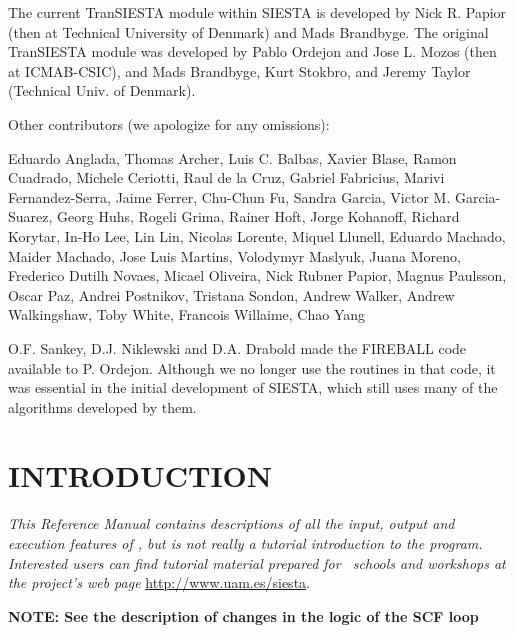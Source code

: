 The current TranSIESTA module within SIESTA is developed by 
Nick R. Papior (then at Technical University of Denmark) and Mads Brandbyge. 
The original TranSIESTA module was developed by
Pablo Ordejon and Jose L. Mozos (then at ICMAB-CSIC), and Mads Brandbyge,
Kurt Stokbro, and Jeremy Taylor (Technical Univ. of Denmark).

Other contributors (we apologize for any omissions):

Eduardo Anglada,
Thomas Archer,
Luis C. Balbas,
Xavier Blase,
Ramon Cuadrado,
Michele Ceriotti,
Raul de la Cruz,
Gabriel Fabricius,
Marivi Fernandez-Serra,
Jaime Ferrer,
Chu-Chun Fu,
Sandra Garcia,
Victor M. Garcia-Suarez,
Georg Huhs,
Rogeli Grima,
Rainer Hoft,
Jorge Kohanoff,
Richard Korytar,
In-Ho Lee,
Lin Lin,
Nicolas Lorente,
Miquel Llunell,
Eduardo Machado,
Maider Machado,
Jose Luis Martins,
Volodymyr Maslyuk,
Juana Moreno,
Frederico Dutilh Novaes, 
Micael Oliveira,
Nick Rubner Papior,
Magnus Paulsson,
Oscar Paz,
Andrei Postnikov,
Tristana Sondon,
Andrew Walker,
Andrew Walkingshaw,
Toby White,
Francois Willaime,
Chao Yang

O.F. Sankey, D.J. Niklewski and D.A. Drabold made the FIREBALL code
available to P. Ordejon.  Although we no longer use the routines in
that code, it was essential in the initial development of SIESTA,
which still uses many of the algorithms developed by them.

\tableofcontents

\newpage

\section{INTRODUCTION}

\textit{This Reference Manual contains descriptions of all the input,
  output and execution features of \siesta, but is not really a
  tutorial introduction to the program. Interested users can find
  tutorial material prepared for \siesta\ schools and workshops at
  the project's web page} \url{http://www.uam.es/siesta}.


\textbf{NOTE: See the description of changes in the logic of the SCF loop}

